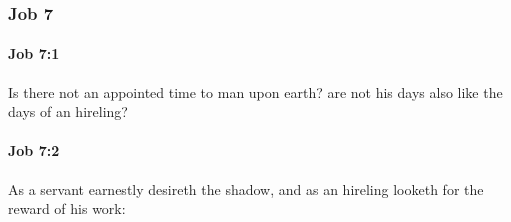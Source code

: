 	\subsubsection{Job 7} %
		\label{JOB-7}

		\paragraph{Job 7:1} %
			\label{JOB-7-1}

			Is there not an appointed time to man upon earth? are not his days also like the days of an hireling?


		\paragraph{Job 7:2} %
			\label{JOB-7-2}

			As a servant earnestly desireth the shadow, and as an hireling looketh for the reward of his work:

